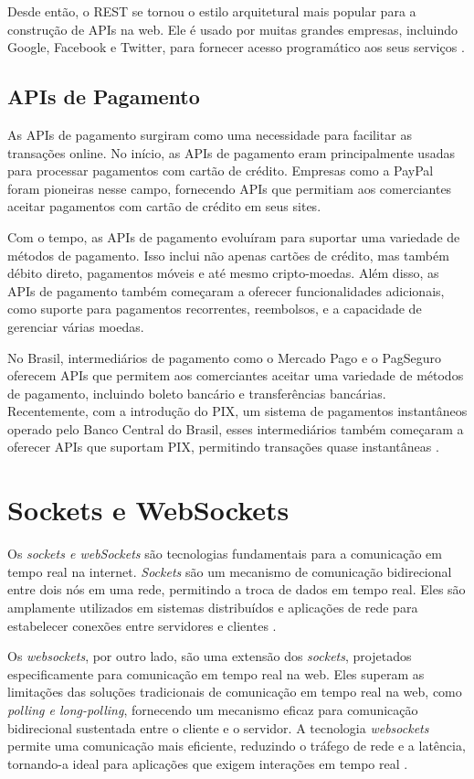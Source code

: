 Desde então, o \gls{REST} se tornou o estilo arquitetural mais popular para a construção de APIs na web. Ele é usado por muitas grandes empresas, incluindo Google, Facebook e Twitter, para fornecer acesso programático aos seus serviços \cite{Richardson2007}.

\subsection{APIs de Pagamento}

As \gls{API}s de pagamento surgiram como uma necessidade para facilitar as transações online. No início, as APIs de pagamento eram principalmente usadas para processar pagamentos com cartão de crédito. Empresas como a PayPal foram pioneiras nesse campo, fornecendo APIs que permitiam aos comerciantes aceitar pagamentos com cartão de crédito em seus sites.

Com o tempo, as APIs de pagamento evoluíram para suportar uma variedade de métodos de pagamento. Isso inclui não apenas cartões de crédito, mas também débito direto, pagamentos móveis e até mesmo cripto-moedas. Além disso, as APIs de pagamento também começaram a oferecer funcionalidades adicionais, como suporte para pagamentos recorrentes, reembolsos, e a capacidade de gerenciar várias moedas.

No Brasil, intermediários de pagamento como o Mercado Pago e o PagSeguro oferecem APIs que permitem aos comerciantes aceitar uma variedade de métodos de pagamento, incluindo boleto bancário e transferências bancárias. Recentemente, com a introdução do PIX, um sistema de pagamentos instantâneos operado pelo Banco Central do Brasil, esses intermediários também começaram a oferecer APIs que suportam PIX, permitindo transações quase instantâneas \cite{Aue2018, Adyen}.

\section{Sockets e WebSockets}
Os \textit{sockets e webSockets} são tecnologias fundamentais para a comunicação em tempo real na internet. \textit{Sockets} são um mecanismo de comunicação bidirecional entre dois nós em uma rede, permitindo a troca de dados em tempo real. Eles são amplamente utilizados em sistemas distribuídos e aplicações de rede para estabelecer conexões entre servidores e clientes \cite{Attoui2000}.

Os \textit{websockets}, por outro lado, são uma extensão dos \textit{sockets}, projetados especificamente para comunicação em tempo real na web. Eles superam as limitações das soluções tradicionais de comunicação em tempo real na web, como \textit{polling e long-polling}, fornecendo um mecanismo eficaz para comunicação bidirecional sustentada entre o cliente e o servidor. A tecnologia \textit{websockets} permite uma comunicação mais eficiente, reduzindo o tráfego de rede e a latência, tornando-a ideal para aplicações que exigem interações em tempo real \cite{Liu2012}.

